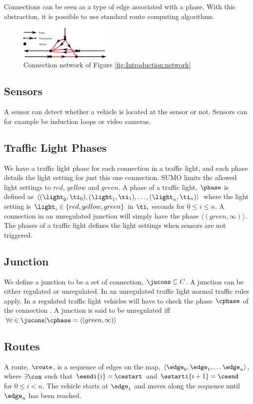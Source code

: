 Connections can be seen as a type of edge associated with a phase.
With this abstraction, it is possible to use standard route computing algorithms.

\begin{figure}[h]
\centering
\includegraphics[width=0.4\textwidth]{images/ConnectionNetwork.png}
\caption{Connection network of Figure \ref{fig:Introduction:network}}
\label{fig:Model:Connection}
\end{figure}

\subsection{Sensors}
A sensor can detect whether a vehicle is located at the sensor or not. 
Sensors can for example be induction loops or video cameras. %

\subsection{Traffic Light Phases}
We have a traffic light phase for each connection in a traffic light, and each phase details the light setting for just this one connection.
SUMO limits the allowed light settings to $red$, $yellow$ and $green$.
A phase of a traffic light, $\phase$ is defined as $\langle(\light_0, \ti_0),(\light_1, \ti_1),\dots, (\light_n, \ti_n) \rangle$ where the light setting is $\light_i\in \{red, yellow, green\}$ in $\ti_i$ seconds for $0 \leq i \leq n$.
A connection in an unregulated junction will simply have the phase $\langle(green, \infty)\rangle$.
The phases of a traffic light defines the light settings when sensors are not triggered. 


\subsection{Junction}
We define a junction \ju to be a set of connection, $\jucons \subseteq C$. 
A junction can be either regulated or unregulated. 
In an unregulated traffic light normal traffic rules apply. 
In a regulated traffic light vehicles will have to check the phase $\cphase$ of the connection \vehpos. 
A junction is said to be unregulated iff $\forall c \in \jucons | \cphase = \langle(green, \infty)\rangle$

\subsection{Routes}
A route, $\route$, is a sequence of edges on the map, $\langle \edge_0, \edge_1, \dots \edge_n \rangle$, where $\exists \con$ such that $\eendi{i} = \cestart$ and $\estarti{i+1} = \ceend$ for $0\leq i< n$.
The vehicle starts at $\edge_1$ and moves along the sequence until $\edge_n$ has been reached.